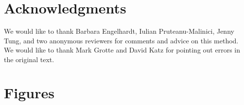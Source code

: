\documentclass[12pt,titlepage]{article}
\begin{document}
\section{Acknowledgments}
	We would like to thank Barbara Engelhardt, Iulian Pruteanu-Malinici, Jenny Tung, and two anonymous reviewers for comments and advice on this method. We would like to thank Mark Grotte and David Katz for pointing out errors in the original text.




\section{Figures}
\end{document}
